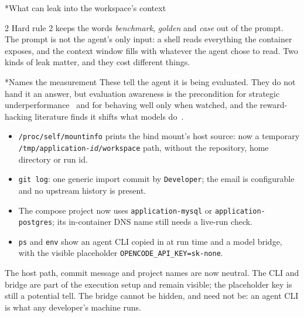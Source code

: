 \documentclass[10pt,a4paper]{article}
\makeatletter
\renewcommand\section{\@startsection{section}{1}{0pt}{0pt}{6pt}%
  {\display\bfseries\Large\color{ink}}}
\renewcommand\subsection{\@startsection{subsection}{2}{0pt}{8pt}{2pt}%
  {\display\bfseries\normalsize\color{ink}}}
\newcommand{\claim}[1]{{\color{inksec}#1}\par}
\makeatother
\begin{document}
\clearpage
\section*{What can leak into the workspace's context}
\begin{multicols}{2}
\claim{Hard rule 2 keeps the words \emph{benchmark}, \emph{golden} and
\emph{case} out of the prompt. The prompt is not the agent's only input:
a shell reads everything the container exposes, and the context window
fills with whatever the agent chose to read. Two kinds of leak matter, and
they cost different things.}

\subsection*{Names the measurement}
These tell the agent it is being evaluated. They do not hand it an
answer, but evaluation awareness is the precondition for strategic
underperformance~\cite{sandbagging} and for behaving well only when
watched, and the reward-hacking literature finds it shifts what models
do~\cite{impossiblebench, naturalmisalign}.
\begin{itemize}
\item \texttt{/proc/self/mountinfo} prints the bind mount's host source:
  now a temporary \texttt{/tmp/application-\textit{id}/workspace} path,
  without the repository, home directory or run id.
\item \texttt{git log}: one generic import commit by \texttt{Developer};
  the email is configurable and no upstream history is present.
\item The compose project now uses \texttt{application-mysql} or
  \texttt{application-postgres}; its in-container DNS name still needs a
  live-run check.
\item \texttt{ps} and \texttt{env} show an agent CLI copied in at run time
  and a model bridge, with the visible placeholder
  \texttt{OPENCODE\_API\_KEY=sk-none}.
\end{itemize}
The host path, commit message and project names are now neutral. The
CLI and bridge are part of the execution setup and remain visible; the
placeholder key is still a potential tell. The bridge cannot be hidden,
and need not be: an agent CLI is what any developer's machine runs.


\end{multicols}
\end{document}
